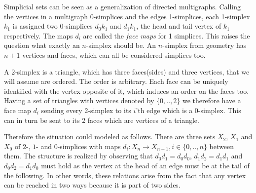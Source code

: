 \documentclass[../../main.tex]{subfiles}
\begin{document}
          
    Simplicial sets can be seen as a generalization of directed multigraphs. Calling the vertices in a multigraph 0-simplices and the edges 1-simplices, each 1-simplex $k_1$ is assigned two 0-simplices $d_0k_1$ and $d_1k_1$, the head and tail vertex of $k_1$ respectively. The maps $d_i$ are called the \emph{face maps} for 1 simplices. This raises the question what exactly an $n$-simplex should be. An $n$-simplex from geometry has $n+1$ vertices and faces, which can all be considered simplices too.

    \begin{example}[2-simplex]
        A $2$-simplex is a triangle, which has three faces(sides) and three vertices, that we will assume are ordered. The order is arbitrary. Each face can be uniquely identified with the vertex opposite of it, which induces an order on the faces too. Having a set of triangles with vertices denoted by $\{0,..,2\}$ we therefore have a face map $d_i$ sending every 2-simplex to its $i$'th edge which is a $0$-simplex. This can in turn be sent to its $2$ faces which are vertices of a triangle. 
        
        Therefore the situation could modeled as follows. There are three sets $X_2$, $X_1$ and $X_0$ of $2$-, $1$- and $0$-simplices with maps $d_i: X_n \to X_{n-1}, i \in \{0,.., n\}$ between them. The structure is realized by observing that $d_0d_1 = d_0d_0$, $d_1d_2 = d_1d_1$ and $d_0d_2 = d_1d_0$ must hold as the vertex at the head of an edge must be at the tail of the following. In other words, these relations arise from the fact that any vertex can be reached in two ways because it is part of two sides.

        \begin{figure}[H]
            \begin{subfigure}[b]{0.3\textwidth}
            \end{subfigure}
        \end{figure}
    \end{example}
\end{document}
